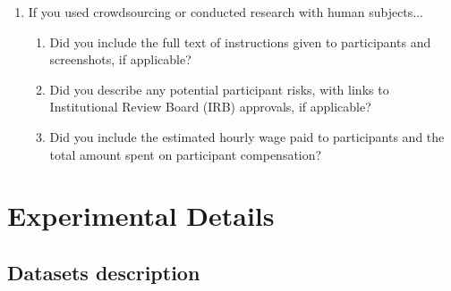 \documentclass{article}
\begin{document}
\begin{enumerate}
\item If you used crowdsourcing or conducted research with human subjects...
\begin{enumerate}
  \item Did you include the full text of instructions given to participants and screenshots, if applicable?
    \answerNA{}
  \item Did you describe any potential participant risks, with links to Institutional Review Board (IRB) approvals, if applicable?
    \answerNA{}
  \item Did you include the estimated hourly wage paid to participants and the total amount spent on participant compensation?
    \answerNA{}
\end{enumerate}

\end{enumerate}


\clearpage
\appendix
\renewcommand\thefigure{\thesection.\arabic{figure}}
\renewcommand\thetable{\thesection.\arabic{table}}

\section{Experimental Details}\label{app:exp_details}
\setcounter{figure}{0}
\setcounter{table}{0}

\subsection{Datasets description}
\label{app:datasets}
\end{document}
